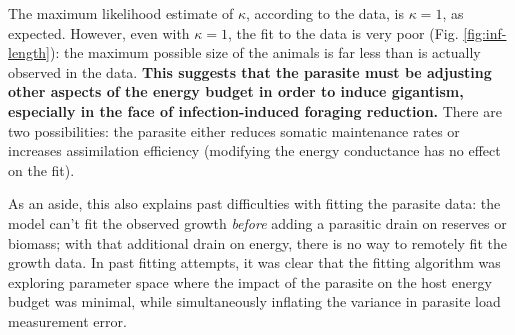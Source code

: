 \documentclass[12pt,reqno,final,pdftex]{amsart}\usepackage[]{graphicx}\usepackage[]{color}
\theoremstyle{plain}
\numberwithin{equation}{part}
\begin{document}
The maximum likelihood estimate of $\kappa$, according to the data, is $\kappa=1$, as expected.
However, even with $\kappa=1$, the fit to the data is very poor (Fig. \ref{fig:inf-length}): the maximum possible size of the animals is far less than is actually observed in the data.
\textbf{This suggests that the parasite must be adjusting other aspects of the energy budget in order to induce gigantism, especially in the face of infection-induced foraging reduction.}
There are two possibilities: the parasite either reduces somatic maintenance rates or increases assimilation efficiency (modifying the energy conductance has no effect on the fit).

As an aside, this also explains past difficulties with fitting the parasite data: the model can't fit the observed growth \emph{before} adding a parasitic drain on reserves or biomass; with that additional drain on energy, there is no way to remotely fit the growth data.
In past fitting attempts, it was clear that the fitting algorithm was exploring parameter space where the impact of the parasite on the host energy budget was minimal, while simultaneously inflating the variance in parasite load measurement error.
\end{document}
